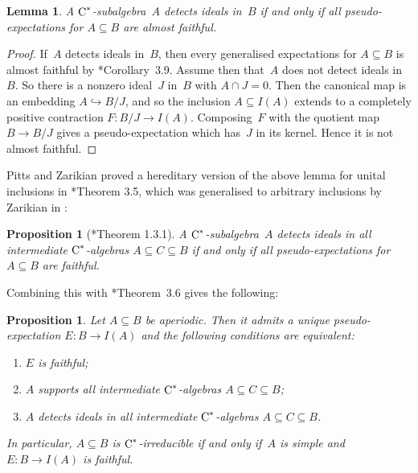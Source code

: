 \documentclass[a4paper]{amsart}
\theoremstyle{plain}
\newtheorem{lemma}[theorem]{Lemma}
\newtheorem{proposition}[theorem]{Proposition}
\theoremstyle{definition}
\theoremstyle{remark}
\numberwithin{theorem}{section}
\numberwithin{equation}{section}
\newcommand*{\nb}{\nobreakdash}
\newcommand*{\Cst}{\textup C^*}%
\begin{document}
\begin{lemma}
  A \(\Cst\)\nb-subalgebra~\(A\) detects ideals in~\(B\) if and only
  if all pseudo-expectations for \(A\subseteq B\) are almost faithful.
\end{lemma}

\begin{proof}
  If~\(A\) detects ideals in~\(B\), then every generalised
  expectations for \(A\subseteq B\) is almost faithful by
  \cite{Kwasniewski-Meyer:Essential}*{Corollary~3.9}.
  Assume then that~\(A\) does not detect ideals in~\(B\).
  So there is a nonzero ideal~\(J\) in~\(B\) with \(A\cap J=0\).
  Then the canonical map is an embedding \(A\hookrightarrow B/J\), and
  so the inclusion \(A\subseteq I(A)\) extends to a completely
  positive contraction \(F\colon  B/J\to I(A)\).
  Composing~\(F\) with the quotient map \(B\to B/J\) gives a
  pseudo-expectation which has~\(J\) in its kernel.
  Hence it is not almost faithful.
\end{proof}

Pitts and Zarikian proved a hereditary version of the above lemma for
unital inclusions in
\cite{Pitts-Zarikian:Unique_pseudoexpectation}*{Theorem 3.5}, which
was generalised to arbitrary inclusions by Zarikian in
\cite{Zarikian:Unique_pseudo}:

\begin{proposition}[\cite{Zarikian:Unique_pseudo}*{Theorem 1.3.1}]
  \label{prop:faithful_pseudo_expectations}
  A \(\Cst\)\nb-subalgebra~\(A\) detects ideals in all intermediate
  \(\Cst\)\nb-algebras \(A\subseteq C \subseteq B\) if and only if all
  pseudo-expectations for \(A\subseteq B\) are faithful.
\end{proposition}

Combining this with
\cite{Kwasniewski-Meyer:Aperiodicity_pseudo_expectations}*{Theorem~3.6}
gives the following:

\begin{proposition}
  \label{prop:aperiodic_implies_supports}
  Let \(A\subseteq B\) be aperiodic.
  Then it admits a unique pseudo-expectation \(E\colon B\to I(A)\) and
  the following conditions are equivalent:
  \begin{enumerate}
  \item \label{enu:aperiodic_implies_supports1}%
    \(E\) is faithful;
  \item \label{enu:aperiodic_implies_supports2}%
    \(A\) supports all intermediate \(\Cst\)\nb-algebras \(A\subseteq
    C \subseteq B\);
  \item \label{enu:aperiodic_implies_supports3}%
    \(A\) detects ideals in all intermediate \(\Cst\)\nb-algebras
    \(A\subseteq C \subseteq B\).
  \end{enumerate}
  In particular, \(A\subseteq B\) is \(\Cst\)\nb-irreducible if and
  only if~\(A\) is simple and \(E\colon B\to I(A)\) is faithful.
\end{proposition}
\end{document}
